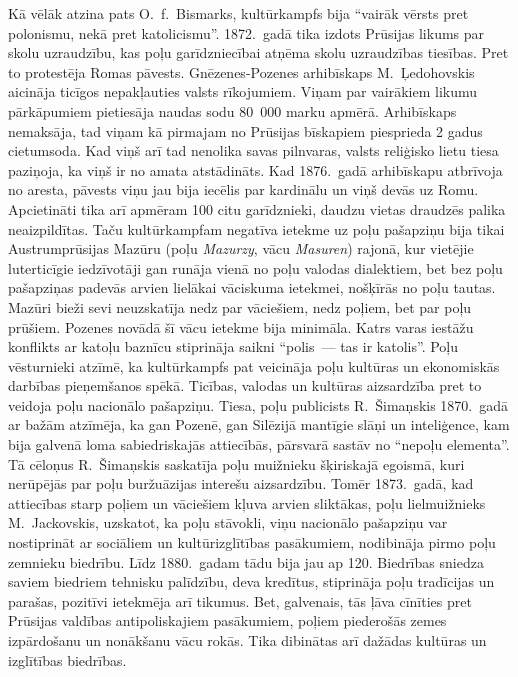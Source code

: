 \documentclass[twoside,a5paper,12pt,fleqn,openany]{extbook}
\newcommand{\pltxti}[1]{\textit{\textpolish{#1}}}
\newcommand{\detxti}[1]{\textit{\textgerman{#1}}}
\begin{document}
Kā vēlāk atzina pats O.~f.~Bismarks, kultūrkampfs bija ``vairāk vērsts pret polonismu, nekā pret katolicismu''. 1872.~gadā tika izdots Prūsijas likums par skolu uzraudzību, kas poļu garīdzniecībai atņēma skolu uzraudzības tiesības. Pret to protestēja Romas pāvests. Gnēzenes-Pozenes arhibīskaps M.~Ļedohovskis aicināja ticīgos nepakļauties valsts rīkojumiem. Viņam par vairākiem likumu pārkāpumiem pietiesāja naudas sodu 80~000 marku apmērā. Arhibīskaps nemaksāja, tad viņam kā pirmajam no Prūsijas bīskapiem piesprieda 2 gadus cietumsoda. Kad viņš arī tad nenolika savas pilnvaras, valsts reliģisko lietu tiesa paziņoja, ka viņš ir no amata atstādināts. Kad 1876.~gadā arhibīskapu atbrīvoja no aresta, pāvests viņu jau bija iecēlis par kardinālu un viņš devās uz Romu. Apcietināti tika arī apmēram 100 citu garīdznieki, daudzu vietas draudzēs palika neaizpildītas. Taču kultūrkampfam negatīva ietekme uz poļu pašapziņu bija tikai Austrumprūsijas Mazūru (poļu \pltxti{Mazurzy}, vācu \detxti{Masuren}) rajonā, kur vietējie luterticīgie iedzīvotāji gan runāja vienā no poļu valodas dialektiem, bet bez poļu pašapziņas padevās arvien lielākai vāciskuma ietekmei, nošķīrās no poļu tautas. Mazūri bieži sevi neuzskatīja nedz par vāciešiem, nedz poļiem, bet par poļu prūšiem. Pozenes novādā šī vācu ietekme bija minimāla. Katrs varas iestāžu konflikts ar katoļu baznīcu stiprināja saikni ``polis~--- tas ir katolis''. Poļu vēsturnieki atzīmē, ka kultūrkampfs pat veicināja poļu kultūras un ekonomiskās darbības pieņemšanos spēkā. Ticības, valodas un kultūras aizsardzība pret to veidoja poļu nacionālo pašapziņu. Tiesa, poļu publicists R.~Šimaņskis 1870.~gadā ar bažām atzīmēja, ka gan Pozenē, gan Silēzijā mantīgie slāņi un inteliģence, kam bija galvenā loma sabiedriskajās attiecībās, pārsvarā sastāv no ``nepoļu elementa''. Tā cēloņus R.~Šimaņskis saskatīja poļu muižnieku šķiriskajā egoismā, kuri nerūpējās par poļu buržuāzijas interešu aizsardzību. Tomēr 1873.~gadā, kad attiecības starp poļiem un vāciešiem kļuva arvien sliktākas, poļu lielmuižnieks M.~Jackovskis, uzskatot, ka poļu stāvokli, viņu nacionālo pašapziņu var nostiprināt ar sociāliem un kultūrizglītības pasākumiem, nodibināja pirmo poļu zemnieku biedrību. Līdz 1880.~gadam tādu bija jau ap 120. Biedrības sniedza saviem biedriem tehnisku palīdzību, deva kredītus, stiprināja poļu tradīcijas un parašas, pozitīvi ietekmēja arī tikumus. Bet, galvenais, tās ļāva cīnīties pret Prūsijas valdības antipoliskajiem pasākumiem, poļiem piederošās zemes izpārdošanu un nonākšanu vācu rokās. Tika dibinātas arī dažādas kultūras un izglītības biedrības.
\end{document}
